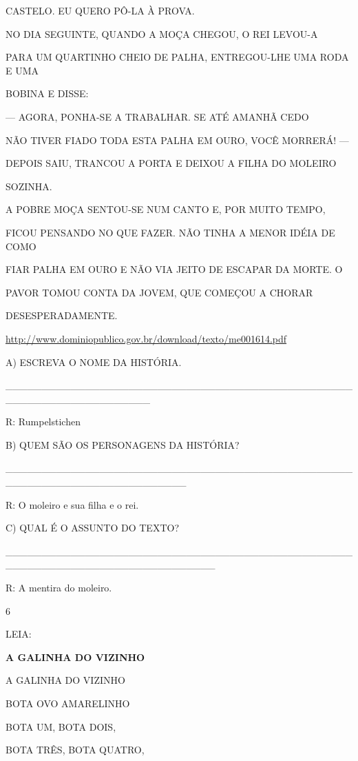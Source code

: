 {{CASTELO. EU QUERO PÔ-LA À PROVA.

NO DIA SEGUINTE, QUANDO A MOÇA CHEGOU, O REI LEVOU-A

PARA UM QUARTINHO CHEIO DE PALHA, ENTREGOU-LHE UMA RODA E UMA

BOBINA E DISSE:

--- AGORA, PONHA-SE A TRABALHAR. SE ATÉ AMANHÃ CEDO

NÃO TIVER FIADO TODA ESTA PALHA EM OURO, VOCÊ MORRERÁ! ---

DEPOIS SAIU, TRANCOU A PORTA E DEIXOU A FILHA DO MOLEIRO

SOZINHA.

A POBRE MOÇA SENTOU-SE NUM CANTO E, POR MUITO TEMPO,

FICOU PENSANDO NO QUE FAZER. NÃO TINHA A MENOR IDÉIA DE COMO

FIAR PALHA EM OURO E NÃO VIA JEITO DE ESCAPAR DA MORTE. O

PAVOR TOMOU CONTA DA JOVEM, QUE COMEÇOU A CHORAR

DESESPERADAMENTE.

\url{http://www.dominiopublico.gov.br/download/texto/me001614.pdf}

A) ESCREVA O NOME DA HISTÓRIA.

\_\_\_\_\_\_\_\_\_\_\_\_\_\_\_\_\_\_\_\_\_\_\_\_\_\_\_\_\_\_\_\_\_\_\_\_\_\_\_\_\_\_\_\_\_\_\_\_\_\_\_\_\_\_\_\_\_\_\_\_\_\_\_\_\_\_\_\_

R: Rumpelstichen

B) QUEM SÃO OS PERSONAGENS DA HISTÓRIA?

\_\_\_\_\_\_\_\_\_\_\_\_\_\_\_\_\_\_\_\_\_\_\_\_\_\_\_\_\_\_\_\_\_\_\_\_\_\_\_\_\_\_\_\_\_\_\_\_\_\_\_\_\_\_\_\_\_\_\_\_\_\_\_\_\_\_\_\_\_\_\_\_\_

R: O moleiro e sua filha e o rei.

C) QUAL É O ASSUNTO DO TEXTO?

\_\_\_\_\_\_\_\_\_\_\_\_\_\_\_\_\_\_\_\_\_\_\_\_\_\_\_\_\_\_\_\_\_\_\_\_\_\_\_\_\_\_\_\_\_\_\_\_\_\_\_\_\_\_\_\_\_\_\_\_\_\_\_\_\_\_\_\_\_\_\_\_\_\_\_\_\_

R: A mentira do moleiro.

\num{6}

LEIA:

\textbf{A GALINHA DO VIZINHO}

A GALINHA DO VIZINHO

BOTA OVO AMARELINHO

BOTA UM, BOTA DOIS,

BOTA TRÊS, BOTA QUATRO,

}}
